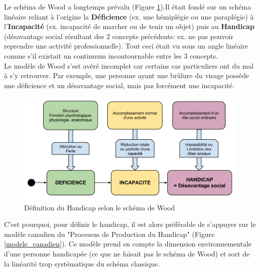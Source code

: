 Le schéma de Wood a longtemps prévalu (Figure \ref{schema_wood}).Il était fondé sur un schéma linéaire reliant à l'origine la \textbf{Déficience} (ex. une hémiplégie ou une paraplégie) à l'\textbf{Incapacité} (ex. incapacité de marcher ou de tenir un objet) puis au \textbf{Handicap} (désavantage social résultant des 2 concepts précédents: ex. ne pas pouvoir reprendre une activité professionnelle). Tout ceci était vu sous un angle linéaire comme s'il existait un continuum incontournable entre les 3 concepts. \\

Le modèle de Wood s'est avéré incomplet car certains cas particuliers ont du mal à s'y retrouver. Par exemple, une personne ayant une brûlure du visage possède une déficience et un désavantage social, mais pas forcément une incapacité.\\

\begin{figure}
\centering
\includegraphics[scale=0.45]{figures/schema_wood.png}
\caption{Définition du Handicap selon le schéma de Wood}
\label{schema_wood}
\end{figure}

C'est pourquoi, pour définir le handicap, il est alors préférable de s'appuyer sur le modèle canadien du "Processus de Production du Handicap" (Figure \ref{modele_canadien}). Ce modèle prend en compte la dimension environnementale d'une personne handicapée (ce que ne faisait pas le schéma de Wood) et sort de la linéarité trop systématique du schéma classique.~\cite{pphFougeyrollas}~\cite{socialConsequences}


